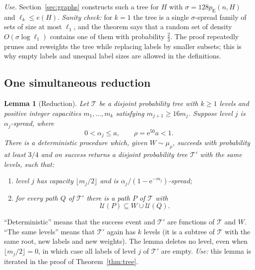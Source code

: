 \documentclass[11pt]{article}
\newtheorem{lemma}[theorem]{Lemma}
\numberwithin{equation}{section}
\newcommand{\pE}{p_{\mathrm E}}
\newcommand{\TT}{\mathcal T}
\newcommand{\UU}{\mathcal U}
\newcommand{\ee}{\mathrm e}
\begin{document}
\emph{Use.} Section~\ref{sec:graphs} constructs such a tree for $H$
with $\sigma=128\pE(n,H)$ and $\ell_k\le e(H)$. \emph{Sanity check:} for
$k=1$ the tree is a single $\sigma$-spread family of sets of size at
most $\ell_1$, and the theorem says that a random set of density
$O(\sigma\log\ell_1)$ contains one of them with probability
$\frac23$. The proof repeatedly prunes and reweights the tree while
replacing labels by smaller subsets; this is why empty labels and
unequal label sizes are allowed in the definitions.

\subsection{One simultaneous reduction}

\begin{lemma}[Reduction]\label{lem:reduction}
Let $\TT$ be a disjoint probability tree with $k\ge1$ levels and
positive integer capacities $m_1,\ldots,m_k$ satisfying
$m_{j+1}\ge16m_j$. Suppose level $j$ is $\alpha_j$-spread, where
\[
 0<\alpha_j\le a,\qquad \rho=\ee^{50}a<1.
\]
There is a deterministic procedure which, given $W\sim\mu_\rho$,
succeeds with probability at least $3/4$ and on success returns a
disjoint probability tree $\TT'$ with the same levels, such that:
\begin{enumerate}[label=(\roman*),leftmargin=2.2em,itemsep=3pt]
 \item level $j$ has capacity $\lfloor m_j/2\rfloor$ and is
 $\alpha_j/(1-\ee^{-m_j})$-spread;
 \item for every path $Q$ of $\TT'$ there is a path $P$ of $\TT$ with
 \begin{equation}\label{eq:recovery}
   \UU(P)\subseteq W\cup\UU(Q).
 \end{equation}
\end{enumerate}
\end{lemma}

``Deterministic'' means that the success event and $\TT'$ are functions
of $\TT$ and $W$. ``The same levels'' means that $\TT'$ again has $k$
levels (it is a subtree of $\TT$ with the same root, new labels and new
weights). The lemma deletes no level, even when
$\lfloor m_j/2\rfloor=0$, in which case all labels of level $j$ of
$\TT'$ are empty. \emph{Use:} this lemma is iterated in the proof of
Theorem~\ref{thm:tree}.
\end{document}
